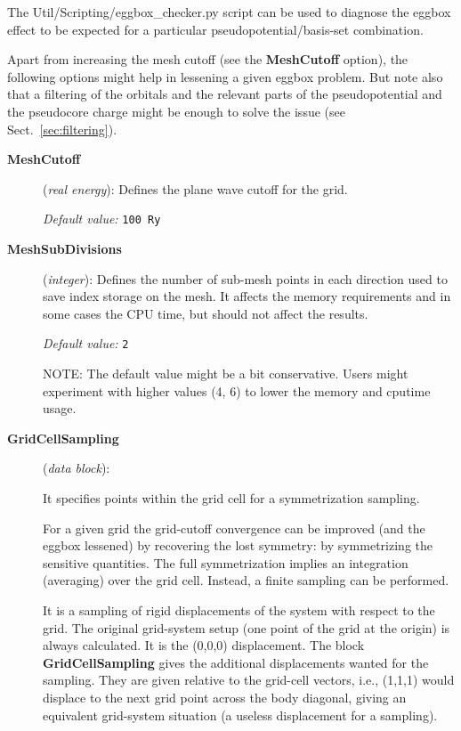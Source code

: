 \documentclass[11pt]{article}
\begin{document}
The Util/Scripting/eggbox\_checker.py script can be used to diagnose
the eggbox effect to be expected for a particular
pseudopotential/basis-set combination.

Apart from increasing the mesh cutoff (see the {\bf MeshCutoff} option),
the following options might help in lessening a given eggbox problem. But
note also that a filtering of the orbitals and the relevant parts of
the pseudopotential and the pseudocore charge might be enough to solve
the issue (see Sect.~\ref{sec:filtering}).

\begin{description}

\item[{\bf MeshCutoff}] ({\it real energy}):
Defines the plane wave cutoff for the grid.

{\it Default value:} {\tt 100 Ry}

\item[{\bf MeshSubDivisions}] ({\it integer}):
   Defines the number of
  sub-mesh points in each direction used to save index storage on the
  mesh. It affects the memory requirements and in some cases the CPU
  time, but should not affect the results.

{\it Default value:} {\tt 2}

NOTE: The default value might be a bit conservative. Users might
experiment with higher values (4, 6) to lower the memory and cputime
usage.

\item[{\bf GridCellSampling}] ({\it data block}):

It specifies points within the grid cell for a symmetrization sampling.

For a given grid the grid-cutoff convergence can be improved (and the
eggbox lessened) by recovering the lost symmetry: by symmetrizing the
sensitive quantities. The full symmetrization implies an integration
(averaging) over the grid cell. Instead, a finite sampling can be
performed.

It is a sampling of rigid displacements of the system with respect
to the grid. The original grid-system setup (one point of the grid
at the origin) is always calculated. It is the (0,0,0) displacement.
The block {\bf GridCellSampling} gives the additional displacements
wanted for the sampling. They are given relative to the grid-cell
vectors, i.e., (1,1,1) would displace to the next grid point across
the body diagonal, giving an equivalent grid-system situation
(a useless displacement for a sampling).


\end{description}
\end{document}
